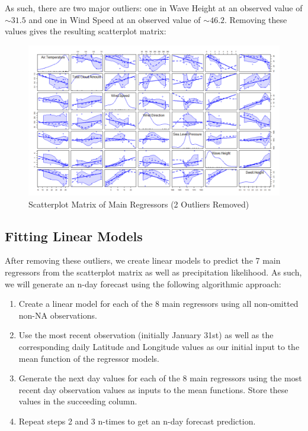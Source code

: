 \documentclass{article}
\begin{document}
As such, there are two major outliers: one in Wave Height at an observed value of $\sim 31.5$ and one in Wind Speed at an observed value of $\sim 46.2$. Removing these values gives the resulting scatterplot matrix:

\begin{figure}[h]
    \centering
    \includegraphics[scale = 0.24]{volume/forecastVarsOutRemoved.png}
    \caption{Scatterplot Matrix of Main Regressors (2 Outliers Removed)}
    \label{fig:SPMFixed}
\end{figure}

\newpage

\subsection{Fitting Linear Models}

After removing these outliers, we create linear models to predict the 7 main regressors from the scatterplot matrix as well as precipitation likelihood. As such, we will generate an n-day forecast using the following algorithmic approach:

\begin{enumerate}
    \item Create a linear model for each of the 8 main regressors using all non-omitted non-NA observations.
    
    \item Use the most recent observation (initially January 31st) as well as the corresponding daily Latitude and Longitude values as our initial input to the mean function of the regressor models.

    \item Generate the next day values for each of the 8 main regressors using the most recent day observation values as inputs to the mean functions. Store these values in the succeeding column.

    \item Repeat steps 2 and 3 n-times to get an n-day forecast prediction.
    
\end{enumerate}
\end{document}
